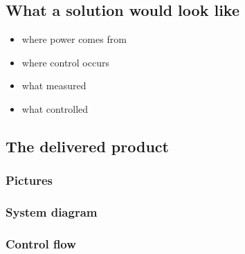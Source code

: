 \subsection{What a solution would look like}
\begin{itemize}
    \item where power comes from
    \item where control occurs
    \item what measured
    \item what controlled
\end{itemize}
\subsection{The delivered product}
\subsubsection{Pictures}
\subsubsection{System diagram}
\subsubsection{Control flow}

